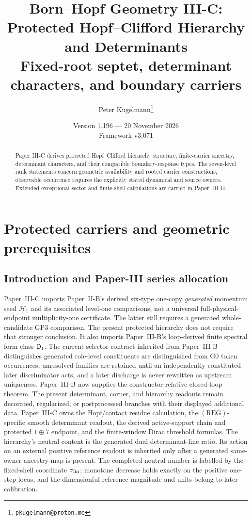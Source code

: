 \documentclass[12pt,a4paper]{article}
\title{\textbf{Born--Hopf Geometry III-C: Protected Hopf--Clifford Hierarchy and Determinants}\\[0.5em]
\large Fixed-root septet, determinant characters, and boundary carriers}
\author{Peter Kugelmann\thanks{\texttt{pkugelmann@proton.me}}}
\date{Version 1.196 --- 20 November 2026 \\ Framework v3.071}
\begin{document}
\maketitle
\begin{abstract}
Paper III-C derives protected Hopf--Clifford hierarchy structure,
finite-carrier ancestry, determinant characters, and their compatible
boundary-response types. The seven-level rank statements concern geometric
availability and rooted carrier constructions; observable occurrence requires
the explicitly stated dynamical and source owners. Extended exceptional-sector
and finite-shell calculations are carried in Paper~III-G.
\end{abstract}
\tableofcontents
\clearpage

\section{Protected carriers and geometric prerequisites}
\label{paper3c:sec:organized-scope}
\subsection{Introduction and Paper-III series allocation}
\label{p3c:sec:series-allocation}
Paper~III-C imports Paper~II-B's derived six-type one-copy \emph{generated}
momentum seed \(\mathcal H_1\) and its associated level-one comparisons,
not a universal full-physical-endpoint multiplicity-one certificate.  The
latter still requires a generated whole-candidate GP3 comparison.  The
present protected hierarchy does not require that stronger conclusion.
It also imports
Paper~III-B's loop-derived finite spectral form class \(\mathsf{D}_1\).  The current
selector contract inherited from Paper~III-B distinguishes generated
role-level constituents are distinguished from G0 token occurrences, unresolved
families are retained until an independently constituted later discriminator acts,
and a later discharge is never rewritten as upstream uniqueness.  Paper~III-B
now supplies the constructor-relative closed-loop theorem.  The present
determinant, corner, and hierarchy readouts remain decorated, regularized, or
postprocessed branches with their displayed additional data.  Paper~III-C owns the
Hopf/contact residue calculation, the \((\mathrm{REG})\)-specific smooth
determinant readout, the derived active-support chain and protected
\(1\oplus7\) endpoint, and the
finite-window Dirac threshold formulas.  The hierarchy's neutral content is
the generated dual determinant-line ratio.  Its action on an external positive
reference readout is inherited only after a generated same-owner ancestry map
is present.  The completed neutral number is labelled by the fixed-shell
coordinate \(\sigma_{\rm fin}\); monotone decrease holds exactly on the
positive one-step locus, and the dimensionful reference magnitude and units
belong to later calibration.
\end{document}
